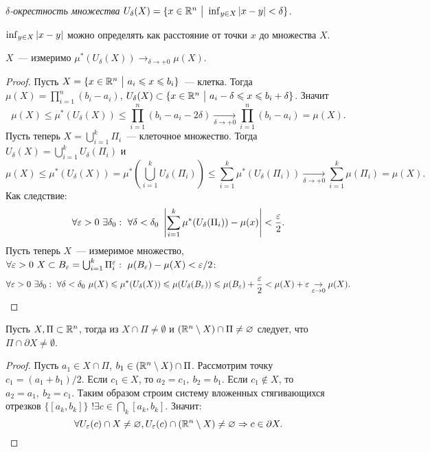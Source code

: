 \documentclass[../main.tex]{subfiles}
\begin{document}
\begin{definition}
    \emph{$\delta$-окрестность множества} $U_\delta(X) = \{x\in\mathbb{R}^n\ \big|\  \operatorname*{inf}_{y\in X} |x-y| < \delta\}$.
\end{definition}

\begin{note}
    $\operatorname*{inf}_{y\in X} |x-y|$ можно определять как расстояние от точки $x$ до множества $X$.
\end{note}

\begin{proposition}
    $X$~--- измеримо \hence $\mu^*(U_\delta(X)) \to_{\delta \to +0} \mu(X)$.
\end{proposition}

\begin{proof}
    Пусть $X = \{x\in\mathbb{R}^n\ \big|\  a_i \leqslant x \leqslant b_i\}$~--- клетка. Тогда $\mu(X) = \prod_{i=1}^n (b_i-a_i)$, $U_\delta (X) \subset \{x\in\mathbb{R}^n\ \big|\  a_i - \delta \leqslant x \leqslant b_i + \delta\}$. Значит 
    $$\mu(X) \leq \mu^*(U_\delta(X)) \leq \prod_{i=1}^n(b_i-a_i - 2\delta) \underset{\delta \to +0}{\to} \prod_{i=1}^n(b_i-a_i) = \mu(X).$$
    Пусть теперь $X = \bigcup_{i=1}^k \Pi_i$~--- клеточное множество. Тогда $U_\delta(X) = \bigcup_{i=1}^k U_{\delta}(\Pi_i)$ и 
    $$\mu(X) \leq \mu^*(U_\delta(X)) = \mu^*\left(\bigcup_{i=1}^k U_\delta (\Pi_i)\right) \leq \sum_{i=1}^k \mu^*(U_\delta (\Pi_i)) \underset{\delta \to +0}{\to} \sum_{i=1}^k \mu(\Pi_i) = \mu(X).$$
    Как следствие:
    $$\forall \varepsilon > 0\ \exists \delta_0:\ \forall \delta < \delta_0\ \left|\sum_{i=1}^k \mu^*(U_\delta (\Pi_i)) - \mu(x)\right| < \frac{\varepsilon}{2}.$$
    Пусть теперь $X$~--- измеримое множество, $\forall \varepsilon > 0\ X \subset B_\varepsilon = \bigcup_{i=1}^k \Pi^\varepsilon_i:\ \mu(B_\varepsilon) - \mu(X) < \varepsilon/2$:
    $$\forall \eps > 0\ \exists \delta_0:\ \forall \delta < \delta_0\ \mu(X) \leq \mu^*(U_\delta(X)) \leq \mu(U_\delta(B_\eps)) \leq \mu(B_\eps) + \frac{\eps}{2} < \mu(X) + \eps \underset{\eps \to 0}{\to} \mu(X).$$
\end{proof}

\begin{proposition}
    Пусть $X, \Pi \subset \mathbb{R}^n$, тогда из $X \cap \Pi \neq \emptyset$ и $(\mathbb{R}^n\setminus X)\cap\Pi \neq \varnothing$ следует, что $\Pi \cap \partial X \neq \emptyset$.
\end{proposition}

\begin{proof}
    Пусть $a_1 \in X \cap \Pi$, $b_1 \in (\mathbb{R}^n\setminus X)\cap\Pi$. Рассмотрим точку $c_1 = (a_1+b_1)/2$. 
    Если $c_1 \in X$, то $a_2 = c_1,\ b_2 = b_1$.
    Если $c_1 \not\in X$, то $a_2 = a_1,\ b_2 = c_1$. Таким образом строим систему вложенных стягивающихся отрезков $\{[a_k,b_k]\}$ \hence $!\exists c \in \bigcap_k [a_k,b_k]$. Значит:
    $$ \forall U_\varepsilon(c) \cap X \neq \varnothing, U_\varepsilon(c) \cap (\mathbb{R}^n \setminus X) \neq \varnothing \Rightarrow c \in \partial X.$$
\end{proof}
\end{document}

